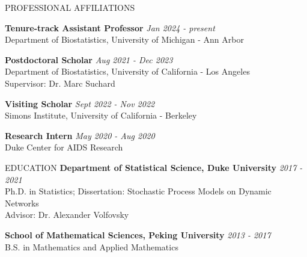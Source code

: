 \documentclass{resume} %
\begin{document}

\begin{rSection}{PROFESSIONAL AFFILIATIONS}
	
{\bf Tenure-track Assistant Professor} \hfill {\em Jan 2024  -  present} 
\\ {\small Department of Biostatistics, University of Michigan - Ann Arbor}
	
{\bf Postdoctoral Scholar} \hfill {\em Aug 2021 - Dec 2023} 
\\ {\small Department of Biostatistics, University of California - Los Angeles}
\\ {\small Supervisor: Dr. Marc Suchard}

{\bf Visiting Scholar} \hfill {\em Sept 2022 - Nov 2022} 
\\ {\small Simons Institute, University of California - Berkeley}


{\bf Research Intern} \hfill {\em May 2020 - Aug 2020} 
\\ { \small Duke Center for AIDS Research}
\end{rSection}

\begin{rSection}{EDUCATION}
{\bf Department of Statistical Science, Duke University} \hfill {\em 2017 - 2021} 
\\ Ph.D. in Statistics; Dissertation: Stochastic Process Models on Dynamic Networks
\\ {\small Advisor: Dr. Alexander Volfovsky}

{\bf School of Mathematical Sciences, Peking University} \hfill {\em 2013 - 2017} 
\\ B.S. in Mathematics and Applied Mathematics
\end{rSection}

%
%



\end{document}
